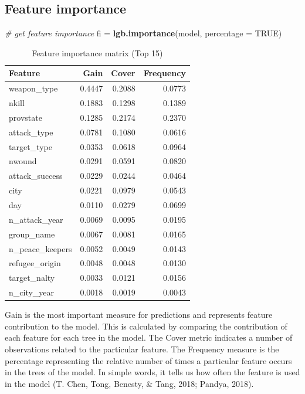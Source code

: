 \documentclass[11pt,oneside,a4paper]{reedthesis}
\newenvironment{Shaded}{\begin{snugshade}}{\end{snugshade}}
\newcommand{\KeywordTok}[1]{\textcolor[rgb]{0.13,0.29,0.53}{\textbf{#1}}}
\newcommand{\DataTypeTok}[1]{\textcolor[rgb]{0.13,0.29,0.53}{#1}}
\newcommand{\StringTok}[1]{\textcolor[rgb]{0.31,0.60,0.02}{#1}}
\newcommand{\CommentTok}[1]{\textcolor[rgb]{0.56,0.35,0.01}{\textit{#1}}}
\newcommand{\OtherTok}[1]{\textcolor[rgb]{0.56,0.35,0.01}{#1}}
\newcommand{\NormalTok}[1]{#1}
\begin{document}
\subsection{Feature importance}\label{feature-importance}
\begin{Shaded}
\begin{Highlighting}[]
\CommentTok{# get feature importance}
\NormalTok{fi =}\StringTok{ }\KeywordTok{lgb.importance}\NormalTok{(model, }\DataTypeTok{percentage =} \OtherTok{TRUE}\NormalTok{)}
\end{Highlighting}
\end{Shaded}
\begin{table}[H]

\caption{\label{tab:unnamed-chunk-135}Feature importance matrix (Top 15)}
\centering
\fontsize{13}{15}\selectfont
\begin{tabular}[t]{lrrr}
\toprule
Feature & Gain & Cover & Frequency\\
\midrule
weapon\_type & 0.4447 & 0.2088 & 0.0773\\
nkill & 0.1883 & 0.1298 & 0.1389\\
provstate & 0.1285 & 0.2174 & 0.2370\\
attack\_type & 0.0781 & 0.1080 & 0.0616\\
target\_type & 0.0353 & 0.0618 & 0.0964\\
\addlinespace
nwound & 0.0291 & 0.0591 & 0.0820\\
attack\_success & 0.0229 & 0.0244 & 0.0464\\
city & 0.0221 & 0.0979 & 0.0543\\
day & 0.0110 & 0.0279 & 0.0699\\
n\_attack\_year & 0.0069 & 0.0095 & 0.0195\\
\addlinespace
group\_name & 0.0067 & 0.0081 & 0.0165\\
n\_peace\_keepers & 0.0052 & 0.0049 & 0.0143\\
refugee\_origin & 0.0048 & 0.0048 & 0.0130\\
target\_nalty & 0.0033 & 0.0121 & 0.0156\\
n\_city\_year & 0.0018 & 0.0019 & 0.0043\\
\bottomrule
\end{tabular}
\end{table}
Gain is the most important measure for predictions and represents
feature contribution to the model. This is calculated by comparing the
contribution of each feature for each tree in the model. The Cover
metric indicates a number of observations related to the particular
feature. The Frequency measure is the percentage representing the
relative number of times a particular feature occurs in the trees of the
model. In simple words, it tells us how often the feature is used in the
model (T. Chen, Tong, Benesty, \& Tang, 2018; Pandya, 2018).
\end{document}
